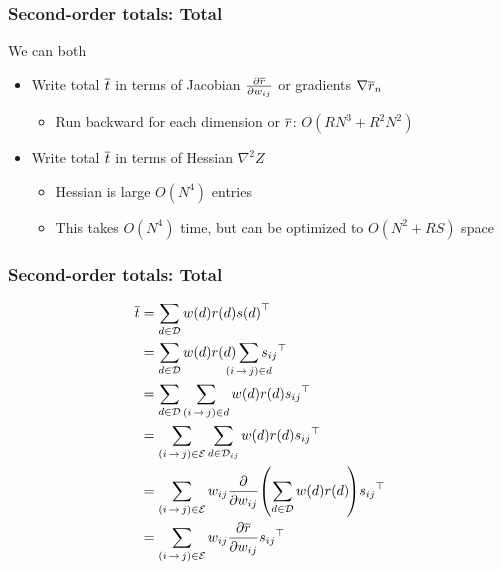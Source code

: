 \documentclass{beamer}
\begin{document}
\begin{frame}
\frametitle{Second-order totals: Total}
We can both
\begin{itemize}
    \item Write total ${\overline{t}}$ in terms of Jacobian
        $\frac{\partial{\overline{r}}}{\partial {w_{ij}}}$
        or gradients $\nabla {\overline{r}}_n$
            \begin{itemize}
            \item Run backward for each dimension or ${\overline{r}}$: $O(RN^3 + R^2N^2)$
            \end{itemize}
    \item Write total ${\overline{t}}$ in terms of Hessian $\nabla^2 Z$
            \begin{itemize}
            \item Hessian is large $O(N^4)$ entries
            \item This takes $O(N^4)$ time, but can be optimized to
                $O(N^2 + RS)$ space
            \end{itemize}
\end{itemize}
\end{frame}

\begin{frame}
\frametitle{Second-order totals: Total}

\begin{align*}
    \tbar
    &= \sum_{\tree\in\st}\wtree{\tree}\rtree{\tree}\stree{\tree}^{\top} \\
    &= \sum_{\tree\in\st}\wtree{\tree}\rtree{\tree}\smashoperator{\sum_{\edgeij\in \tree}}\sedge{ij}^{\top} \\
    &= \sum_{\tree\in\st}\sum_{\edgeij\in \tree}\wtree{\tree}\rtree{\tree}\sedge{ij}^{\top} \\
    &= \sum_{\edgeij\in\edges}\sum_{\tree\in\inc{ij}}\wtree{\tree}\rtree{\tree}\sedge{ij}^{\top} \\
    &= \sum_{\edgeij\in\edges} \wedge{ij}\frac{\partial}{\partial \wedge{ij}} \!\left(  \sum_{\tree\in\st}\wtree{\tree}\rtree{\tree}\!\right)\!\sedge{ij}^{\top} \\
    &= \sum_{\edgeij\in\edges}\wedge{ij}\frac{\partial \rbar}{\partial \wedge{ij}}\sedge{ij}^{\top}
\end{align*}
\end{frame}
\end{document}
